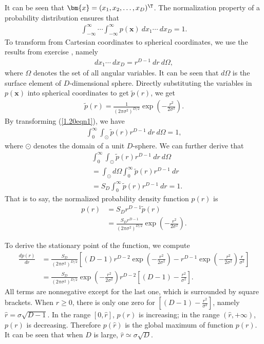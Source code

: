 \begin{answer}{}
	It can be seen that $\bm{x} = (x_1, x_2, \ldots, x_D)^{\T}$. The normalization property of a probability distribution ensures that
	\begin{align}\label{1.20eqn1}
		\int_{-\infty}^{\infty}\cdots \int_{-\infty}^{\infty} p(\bm{x})\ dx_1\cdots\ dx_D = 1.
	\end{align}
	To transform from Cartesian coordinates to spherical coordinates, we use the results from exercise , namely
	\begin{align}
		dx_1\cdots\ dx_D = r^{D-1}\ dr\ d\Omega,
	\end{align}
	where $\Omega$ denotes the set of all angular variables. It can be seen that $d\Omega$ is the surface element of $D$-dimensional sphere. Directly substituting the variables in $p(\bm{x})$ into spherical coordinates to get $\tilde{p}(r)$, we get
	\begin{align}
		\tilde{p}(r) = \frac{1}{(2\pi\sigma^2)^{D/2}} \exp\left( -\frac{r^2}{2\sigma^2} \right).
	\end{align}
	By transforming (\ref{1.20eqn1}), we have
	\begin{align}
		\int_{0}^{\infty}\int_{\odot} \tilde{p}(r) r^{D-1}\ dr\ d\Omega = 1,
	\end{align}
	where $\odot$ denotes the domain of a unit $D$-sphere. We can further derive that
	\begin{align}
		&\int_{0}^{\infty}\int_{\odot} \tilde{p}(r) r^{D-1}\ dr\ d\Omega\\
		&= \int_{\odot}d\Omega \int_{0}^{\infty} \tilde{p}(r) r^{D-1}\ dr\\
		&= S_D \int_{0}^{\infty} \tilde{p}(r) r^{D-1}\ dr = 1.
	\end{align}
	That is to say, the normalized probability density function $p(r)$ is
	\begin{align}
		p(r) &= S_D r^{D-1} \tilde{p}(r)\\
		&= \frac{S_D r^{D-1}}{(2\pi\sigma^2)^{D/2}} \exp\left( -\frac{r^2}{2\sigma^2} \right).
	\end{align}

	To derive the stationary point of the function, we compute
	\begin{align}
		\frac{dp(r)}{dr} &= \frac{S_D}{(2\pi\sigma^2)^{D/2}}\left[ (D-1)r^{D-2}\exp\left( -\frac{r^2}{2\sigma^2}\right) - r^{D-1}\exp\left(-\frac{r^2}{2\sigma^2}\right)\frac{r}{\sigma^2} \right]\\
		&= \frac{S_D}{(2\pi\sigma^2)^{D/2}}\exp\left( -\frac{r^2}{2\sigma^2}\right)r^{D-2}\left[(D-1) - \frac{r^2}{\sigma^2}\right].
	\end{align}
	All terms are nonnegative except for the last one, which is surrounded by square brackets. When $r \geq 0$, there is only one zero for $\left[(D-1) - \frac{r^2}{\sigma^2}\right]$, namely $\hat{r} = \sigma\sqrt{D-1}$. In the range $[0, \hat{r}]$, $p(r)$ is increasing; in the range $(\hat{r}, +\infty)$, $p(r)$ is decreasing. Therefore $p(\hat{r})$ is the global maximum of function $p(r)$. It can be seen that when $D$ is large, $\hat{r} \simeq \sigma\sqrt{D}$.
	

\end{answer}
